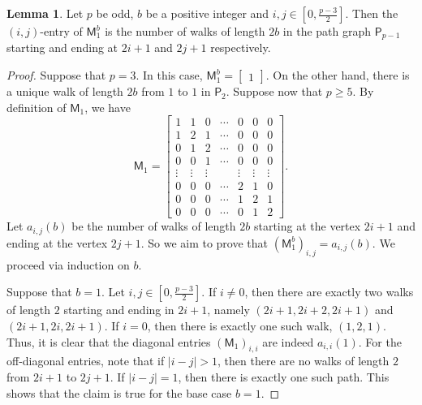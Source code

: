 \documentclass[12pt,reqno]{amsart}
\renewcommand{\geq}{\geqslant}
\newcommand{\M}{\mathsf{M}}
\theoremstyle{definition}
\newtheorem{lem}[thm]{Lemma}
\numberwithin{equation}{section}
\begin{document}
\begin{lem}\label{L:m1paths} Let $p$ be odd, $b$ be a positive integer and $i,j\in [0,\frac{p-3}{2}]$. Then the $(i,j)$-entry of $\M_1^b$ is the number of walks of length $2b$ in the path graph $\mathsf{P}_{p-1}$ starting and ending at $2i+1$ and $2j+1$ respectively. 
\end{lem}
\begin{proof} Suppose that $p=3$. In this case, $\M_1^b=\begin{bmatrix}
    1
\end{bmatrix}$. On the other hand, there is a unique walk of length $2b$ from $1$ to $1$ in $\mathsf{P}_2$. Suppose now that $p\geq 5$. By definition of $\M_1$, we have \[\M_1=\begin{bmatrix}
		1&1&0&\cdots&0&0&0\\ 1&2&1&\cdots& 0&0&0\\ 0&1&2&\cdots&0&0&0\\
		0&0&1&\cdots&0&0&0\\ \vdots&\vdots&\vdots&&\vdots&\vdots&\vdots\\ 0&0&0&\cdots&2&1&0\\ 0&0&0&\cdots&1&2&1\\ 0&0&0&\cdots&0&1&2
	\end{bmatrix}.\]  Let $a_{i,j}(b)$ be the number of walks of length $2b$ starting at the vertex $2i+1$ and ending at the vertex $2j+1$. So we aim to prove that $(\M_1^b)_{i,j}=a_{i,j}(b)$. We proceed via induction on $b$. 
	
	Suppose that $b=1$. Let $i,j\in [0,\frac{p-3}{2}]$. If
$i\neq 0$, then there are exactly two walks of length $2$ starting and ending in $2i+1$, namely $(2i+1, 2i+2, 2i+1)$ and $(2i+1, 2i, 2i+1)$. If $i=0$, then there is exactly one such walk, $(1, 2, 1)$. Thus, it is clear that the diagonal entries $(\M_1)_{i,i}$ are indeed $a_{i,i}(1)$. For the off-diagonal entries, note that if $|i-j|>1$, then there are no walks of length $2$ from $2i+1$ to $2j+1$. If $|i-j|=1$, then there is exactly one such path. This shows that the claim is true for the base case $b=1$.


\end{proof}
\end{document}
